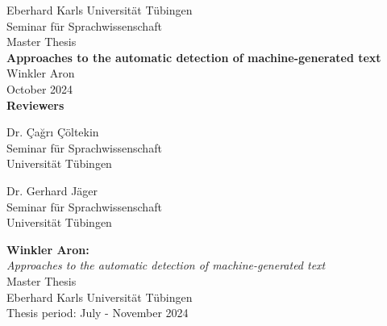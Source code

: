 \documentclass[a4paper,UKenglish,compactauthor]{lipics-v2021}
\title{\thesisTitle}
\newcommand{\authorName}{Winkler Aron}
\newcommand{\thesisTitle}{Approaches to the automatic detection of
machine-generated text}
\newcommand{\thesisDate}{October 2024}
\begin{document}

\begin{titlepage}
  \begin{center}
    {\LARGE Eberhard Karls Universität Tübingen}\\
    {\large Seminar für Sprachwissenschaft \\[4cm]}
    {\huge Master Thesis\\[2cm]}
    {\Large\bf  \thesisTitle\\[1.5cm]}
    {\large \authorName}\\[0.5cm]
    \thesisDate\\[4cm]
    {\small\bf Reviewers}\\[0.5cm]
    \parbox{7cm}%
    {\begin{center}{\large Dr. Çağrı Çöltekin}\\
        {\footnotesize Seminar für Sprachwissenschaft \\
        Universität Tübingen\vspace{0.4cm}}\end{center}}\hfill\parbox{7cm}%
    {\begin{center}
        {\large Dr. Gerhard Jäger}\\
        {\footnotesize Seminar für Sprachwissenschaft \\
        Universität Tübingen}\end{center}
    }
  \end{center}
\end{titlepage}


\thispagestyle{empty}
\vspace*{\fill}
\begin{minipage}{11.2cm}
  \textbf{\authorName:}\\
  \emph{\thesisTitle}\\ Master Thesis\\
  Eberhard Karls Universität Tübingen\\
  Thesis period: July - November 2024
\end{minipage}
\newpage

\end{document}

